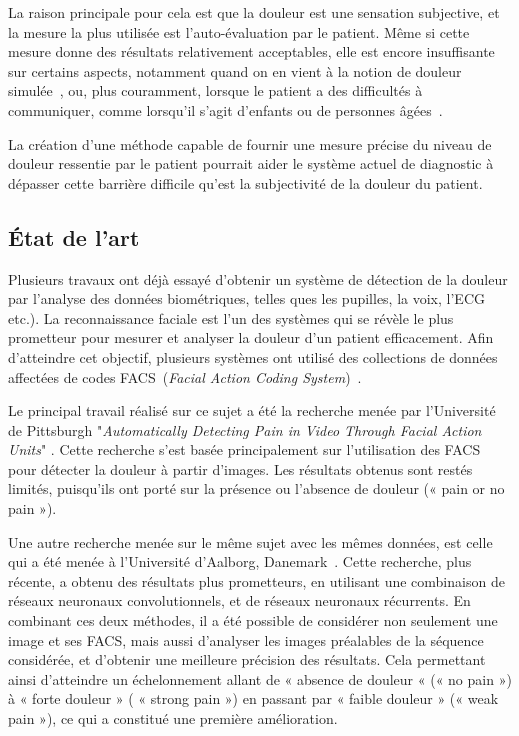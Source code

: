 \documentclass[11pt]{article}
\begin{document}
La raison principale pour cela est  que la douleur est une sensation subjective,
et la  mesure la plus  utilisée est l’auto-évaluation  par le patient.   Même si
cette  mesure donne  des  résultats relativement  acceptables,  elle est  encore
insuffisante sur  certains aspects, notamment quand  on en vient à  la notion de
douleur simulée~\cite{gwen2007faces}, ou, plus  couramment, lorsque le patient a
des difficultés à communiquer, comme  lorsqu’il s’agit d’enfants ou de personnes
âgées~\cite{lucey2011automatically}.

La création  d’une méthode capable  de fournir une  mesure précise du  niveau de
douleur ressentie par le patient pourrait  aider le système actuel de diagnostic
à dépasser  cette barrière  difficile qu'est  la subjectivité  de la  douleur du
patient.


\subsection{\'Etat de l'art}
\label{sec:org08f9dfb}

Plusieurs travaux  ont d\'ej\`a essayé d’obtenir  un système de détection  de la
douleur par  l’analyse des  données biométriques, telles  ques les  pupilles, la
voix, l'ECG etc.). La reconnaissance faciale est l'un des systèmes qui se révèle
le  plus   prometteur  pour  mesurer   et  analyser  la  douleur   d'un  patient
efficacement.  Afin d’atteindre cet objectif, plusieurs systèmes ont utilisé des
collections  de données  affectées  de codes  FACS~(\emph{Facial Action  Coding
  System})~\cite{lucey2011painful}.

Le  principal  travail  réalisé sur  ce  sujet  a  été  la recherche  menée  par
l’Université de Pittsburgh "\emph{Automatically  Detecting Pain in Video Through
  Facial  Action Units}"  \cite{lucey2011automatically}.  Cette  recherche s’est
basée  principalement sur  l’utilisation des  FACS  pour détecter  la douleur  à
partir d'images. Les résultats obtenus sont restés limités, puisqu'ils ont porté
sur la présence ou l’absence de douleur (« pain or no pain »).

Une autre recherche  menée sur le même  sujet avec les mêmes  données, est celle
qui        a       été        menée        à       l’Université        d’Aalborg,
Danemark~\cite{bellantonio2016spatio}. Cette  recherche, plus récente,  a obtenu
des  résultats  plus  prometteurs,  en  utilisant  une  combinaison  de  réseaux
neuronaux convolutionnels, et de réseaux neuronaux récurrents.  En combinant ces
deux méthodes, il  a été possible de  considérer non seulement une  image et ses
FACS, mais aussi d’analyser les images  préalables de la séquence considérée, et
d’obtenir  une   meilleure  précision  des  résultats.   Cela  permettant  ainsi
d’atteindre un échelonnement allant de « absence de  douleur « (« no pain ») à «
forte douleur » ( « strong pain ») en  passant par « faible douleur » (« weak pain
»), ce qui a constitué une première amélioration.
\end{document}
